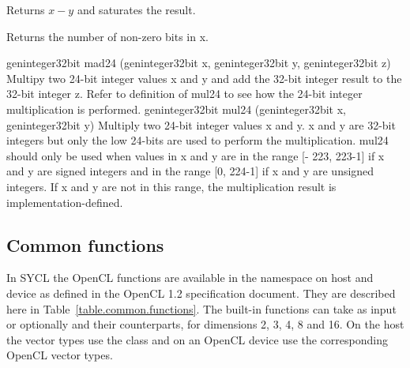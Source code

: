 { Returns $x - y$ and saturates the result.}

{}

{}

{}

{}

{}

{}

{ Returns the number of non-zero bits in x.}

\addRow
{geninteger32bit mad24 (geninteger32bit x, geninteger32bit y, geninteger32bit z)}
{
Multipy two 24-bit integer values x and y and add
the 32-bit integer result to the 32-bit integer z.
Refer to definition of mul24 to see how the 24-bit
integer multiplication is performed.
}
\addRow
{geninteger32bit mul24 (geninteger32bit x, geninteger32bit y)}
{
Multiply two 24-bit integer values x and y. x and y
are 32-bit integers but only the low 24-bits are used
to perform the multiplication. mul24 should only
be used when values in x and y are in the range [-
223, 223-1] if x and y are signed integers and in the
range [0, 224-1] if x and y are unsigned integers. If
x and y are not in this range, the multiplication
result is implementation-defined.
}
\completeTable

\subsection{Common functions}
In SYCL the OpenCL  functions are available in the
namespace  on host and device as defined in the
OpenCL 1.2 specification document\cite[par. 6.12.4]{opencl12}. They
are described here in Table~\ref{table.common.functions}. The built-in
functions can take as input  or optionally
 and their  counterparts, for
dimensions 2, 3, 4, 8 and 16. On the host the vector types use the
 class and on an OpenCL device use the corresponding
OpenCL vector types.

